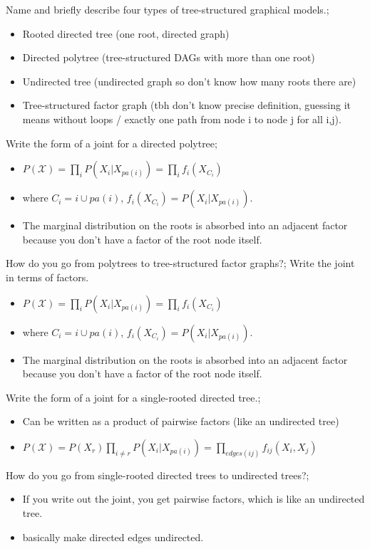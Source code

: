 \documentclass{article}
\begin{document}
Name and briefly describe four types of tree-structured graphical models.; \begin{itemize} \item Rooted directed tree (one root, directed graph) \item Directed polytree (tree-structured DAGs with more than one root) \item Undirected tree (undirected graph so don't know how many roots there are) \item Tree-structured factor graph (tbh don't know precise definition, guessing it means without loops / exactly one path from node i to node j for all i,j).  \end{itemize}

Write the form of a joint for a directed polytree; \begin{itemize} \item $P(\mathcal{X})=\prod_i P(X_i|X_{pa(i)}) = \prod_i f_i(X_{C_i})$ \item where $C_i = i\cup pa(i)$, $f_i(X_{C_i})=P(X_i|X_{pa(i)})$.  \item The marginal distribution on the roots is absorbed into an adjacent factor because you don't have a factor of the root node itself.  \end{itemize}

How do you go from polytrees to tree-structured factor graphs?; Write the joint in terms of factors. \begin{itemize} \item $P(\mathcal{X})=\prod_i P(X_i|X_{pa(i)}) = \prod_i f_i(X_{C_i})$ \item where $C_i = i\cup pa(i)$, $f_i(X_{C_i})=P(X_i|X_{pa(i)})$.  \item The marginal distribution on the roots is absorbed into an adjacent factor because you don't have a factor of the root node itself.  \end{itemize}

Write the form of a joint for a single-rooted directed tree.; \begin{itemize} \item Can be written as a product of pairwise factors (like an undirected tree) \item $P(\mathcal{X})=P(X_r)\prod_{i\ne r} P(X_i|X_{pa(i)}) = \prod_{edges(ij)} f_{ij}(X_{i}, X_j)$ \end{itemize}

How do you go from single-rooted directed trees to undirected trees?; \begin{itemize} \item If you write out the joint, you get pairwise factors, which is like an undirected tree.  \item basically make directed edges undirected.  \end{itemize}
\end{document}
